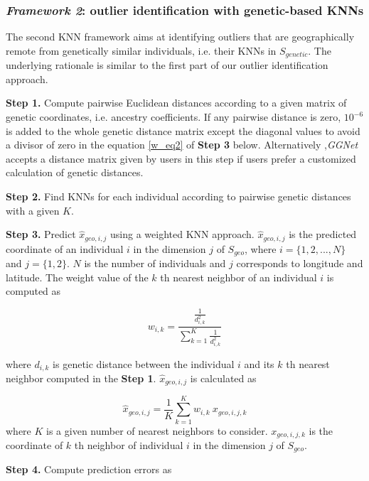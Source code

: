 \documentclass[11pt]{article}
\begin{document}
\subsubsection*{\textit{Framework 2}: outlier identification with genetic-based KNNs}

The second KNN framework aims at identifying outliers that are geographically remote from genetically similar individuals, i.e. their KNNs in $S_{genetic}$. 
The underlying rationale is similar to the first part of our outlier identification approach.

\textbf{Step 1.} Compute pairwise Euclidean distances according to a given matrix of genetic coordinates, i.e. ancestry coefficients. 
If any pairwise distance is zero, $10^{-6}$ is added to the whole genetic distance matrix except the diagonal values to avoid a divisor of zero in the equation \ref{w_eq2} of \textbf{Step 3} below. Alternatively ,\textit{GGNet} accepts a distance matrix given by users in this step if users prefer a customized calculation of genetic distances.


\textbf{Step 2.} Find KNNs for each individual according to pairwise genetic distances with a given $K$.

\textbf{Step 3.} Predict $\hat{x}_{geo,i,j}$ using a weighted KNN approach.
$\hat{x}_{geo,i,j}$ is the predicted coordinate of an individual $i$ in the dimension $j$ of $S_{geo}$, where $i = \{1,2,...,N\}$ and $j = \{1,2\}$. 
$N$ is the number of individuals and $j$ corresponds to longitude and latitude. 
The weight value of the $k$ th nearest neighbor of an individual $i$ is computed as

\begin{equation} \label{w_eq2}
w_{i,k}=\frac{\frac{1}{d_{i,k}^2}}{\sum_{k=1}^{K} \frac{1}{d_{i,k}^2}}
\end{equation}

where $d_{i,k}$ is genetic distance between the individual $i$ and its $k$ th nearest neighbor computed in the \textbf{Step 1}.
$\hat{x}_{geo,i,j}$ is calculated as

\begin{equation} \label{wknn_eq2}
\hat{x}_{geo,i,j}=\frac{1}{K}\sum_{k=1}^{K}w_{i,k}\ x_{geo,i,j,k}
\end{equation}
where $K$ is a given number of nearest neighbors to consider. $x_{geo,i,j,k}$ is the coordinate of $k$ th neighbor of individual $i$ in the dimension $j$ of $S_{geo}$.

\textbf{Step 4.} Compute prediction errors as 
\end{document}
